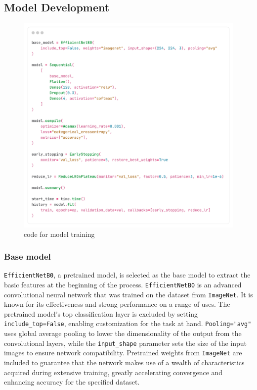 \documentclass[12pt,onecolumn]{report}
\begin{document}
\subsection{Model Development}
\begin{figure}[H]
    \centering
    \includegraphics[width=0.8\columnwidth]{figures/imp_model_training.png}  %
    \caption{code for model training} %
    \label{fig:imp_model_training} %
\end{figure}
\subsubsection{Base model}
\texttt{EfficientNetB0}, a pretrained model, is selected as the base model to extract the basic features at the beginning of the process. \texttt{EfficientNetB0} is an advanced convolutional neural network that was trained on the dataset from \texttt{ImageNet}. It is known for its effectiveness and strong performance on a range of uses. The pretrained model's top classification layer is excluded by setting \texttt{include\_top=False}, enabling customization for the task at hand. \texttt{Pooling="avg"} uses global average pooling to lower the dimensionality of the output from the convolutional layers, while the \texttt{input\_shape} parameter sets the size of the input images to ensure network compatibility. Pretrained weights from \texttt{ImageNet} are included to guarantee that the network makes use of a wealth of characteristics acquired during extensive training, greatly accelerating convergence and enhancing accuracy for the specified dataset.
\end{document}
